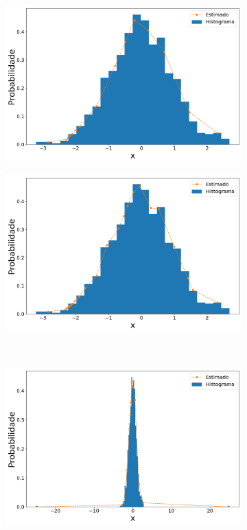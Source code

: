 \begin{figure}[H]
	\centering\begin{subfigure}[b]{0.45\textwidth}
		\centering 
		\includegraphics[width=\linewidth]{./figuras/iPDF2_normal_15_1_1000_0}
		\caption{}
		\label{fig:ipdf2_norm15_data}
	\end{subfigure}
	\hfill
	\begin{subfigure}[b]{0.45\textwidth}
		\centering 
		\includegraphics[width=\linewidth]{./figuras/iPDF2_normal_25_1_1000_0}
		\caption{}
		\label{fig:ipdf2_norm25_data}
	\end{subfigure}
	\\
	\begin{subfigure}[b]{0.45\textwidth}
		\centering 
		\includegraphics[width=\linewidth]{./figuras/iPDF2_normal_15_1_1000_25}

\end{subfigure}
\end{figure}
